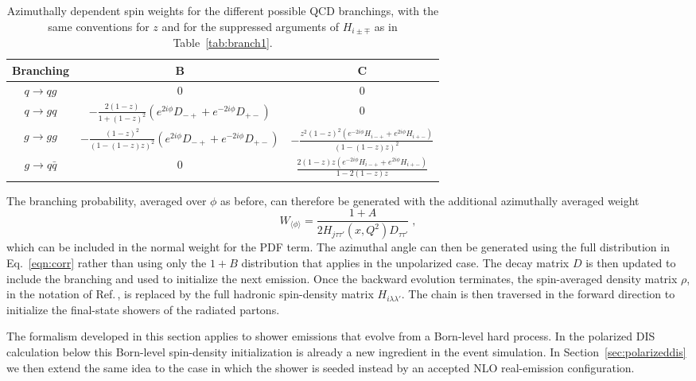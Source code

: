 \documentclass[a4paper,11pt]{article}
\begin{document}
\begin{table}
  \begin{center}
    \begin{tabular}{|c|c|c|}
      \hline
      Branching & B & C \\
      \hline
      $q\to qg$ & 0 & 0 \\
      \hline
      $q\to gq$ & $-\frac{2 (1-z)}{1+(1-z)^2} \left(e^{2 i \phi } D_{-+}+e^{-2 i \phi } D_{+-}\right)$& 0 \\
      \hline
      $g\to gg$ & $-\frac{(1-z)^2}{(1-(1-z) z)^2} \left(e^{2 i \phi } D_{-+}+e^{-2 i \phi } D_{+-}\right)$ & $-\frac{z^2 (1-z)^2 \left(e^{-2 i \phi } H_{i-+}+e^{2 i \phi }H_{i+-}\right)}{(1-(1-z) z)^2}$\\
      \hline
      $g\to q\bar{q}$ & 0 &  $\frac{2 (1-z) z \left(e^{-2 i \phi } H_{i-+}+e^{2 i \phi } H_{i+-}\right)}{1-2 (1-z) z}$\\
      \hline
  \end{tabular}
    \caption{Azimuthally dependent spin weights for the different possible QCD branchings, with the same conventions for $z$ and for the suppressed arguments of $H_{i\pm\mp}$ as in Table~\ref{tab:branch1}.}
    \label{tab:branch2}
  \end{center}
\end{table}

The branching probability, averaged over $\phi$ as before, can therefore be generated with the additional azimuthally averaged weight
\begin{equation}
  W_{\langle\phi\rangle} = \frac{1+A}{2H_{j\tau\tau'}(x,Q^2) D_{\tau\tau'}}\;,
\label{eq:Wphi}
\end{equation}
which can be included in the normal weight for the PDF term. The azimuthal angle can then be generated using the full distribution in Eq.~\eqref{eqn:corr} rather than
using only the $1+B$ distribution that applies in the unpolarized case. The decay matrix $D$ is then updated to include the branching and used to initialize the next emission. Once the backward evolution terminates, the spin-averaged density matrix $\rho$, in the notation of Ref.\,\cite{Richardson:2018pvo}, is replaced by the full hadronic spin-density matrix $H_{i\lambda\lambda'}$. The chain is then traversed in the forward direction to initialize the final-state showers of the radiated partons.

The formalism developed in this section applies to shower emissions that evolve from a Born-level hard process. In the polarized DIS calculation below this Born-level spin-density initialization is already a new ingredient in the event simulation. In Section~\ref{sec:polarizeddis} we then extend the same idea to the case in which the shower is seeded instead by an accepted NLO real-emission configuration.
\end{document}
